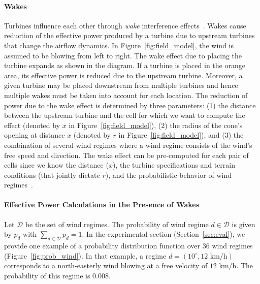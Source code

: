 \documentclass[preprint,12pt]{elsarticle}
\begin{document}
\paragraph{Wakes}
Turbines influence each other through \emph{wake} interference effects~\cite{jensen1983note,shakoor2016wake}.
Wakes cause reduction of the effective power produced by a turbine due
to upstream turbines that change the airflow dynamics. In
Figure~\ref{fig:field_model}, the wind is assumed to be
blowing from left to right. The wake effect due to placing the turbine
expands as shown in the diagram.
If a turbine is placed in the orange area, its effective power is
reduced due to the upstream turbine.
Moreover, a given turbine may be placed downstream from multiple turbines and hence
multiple wakes must be taken into account for each location.  The
reduction of power due to the wake effect is determined by three
parameters: (1) the distance between the upstream turbine and the cell
for which we want to compute the effect (denoted by $x$ in
Figure~\ref{fig:field_model}), (2) the radius of the cone's opening at distance $x$ 
(denoted by $r$ in Figure~\ref{fig:field_model}), and (3) the
combination of several wind regimes where a wind regime consists of 
the wind's free speed and direction.  The wake effect can be pre-computed
for each pair of cells since we know the distance ($x$), the turbine
specifications and terrain conditions (that jointly dictate $r$), and the
probabilistic behavior of wind regimes~\cite{Zhang2014}.
	 
\paragraph{Effective Power Calculations in the Presence of Wakes} 
Let $\mathcal{D}$ be the set of wind regimes.
The probability of wind regime 
$d \in \mathcal{D}$ is given by $p_d$ with $\sum_{d \in \mathcal{D}}^{} p_d = 1$. In the experimental section (Section~\ref{sec:eval}),
we provide one example of a probability distribution 
function over $36$ wind regimes (Figure~\ref{fig:prob_wind}). In that example, 
a regime $d=(10^\circ, 12 \mbox{ km/h})$ corresponds to a north-easterly wind blowing at a free velocity of $12\mbox{ km/h}$. The
probability of this regime is $0.008$.
\end{document}
